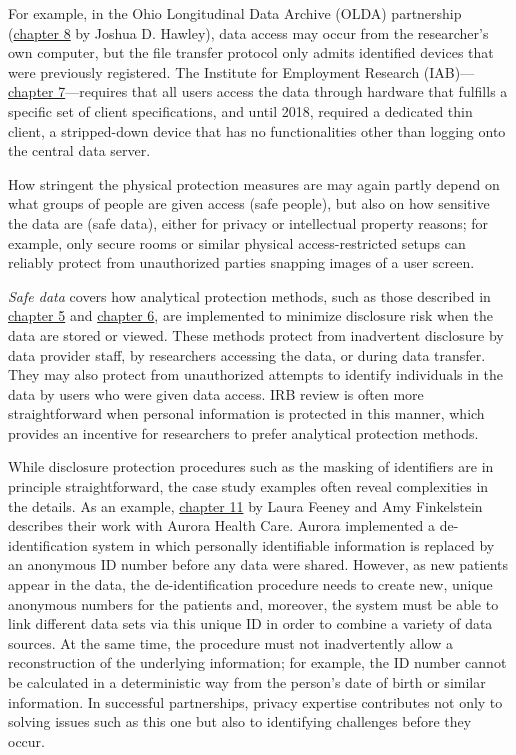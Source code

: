 For example, in the Ohio Longitudinal Data Archive (OLDA) partnership (\protect\hyperlink{olda}{chapter 8} by Joshua D. Hawley), data access may occur from the researcher's own computer, but the file transfer protocol only admits identified devices that were previously registered. The Institute for Employment Research (IAB)---\protect\hyperlink{iab}{chapter 7}---requires that all users access the data through hardware that fulfills a specific set of client specifications, and until 2018, required a dedicated thin client, a stripped-down device that has no functionalities other than logging onto the central data server.

How stringent the physical protection measures are may again partly depend on what groups of people are given access (safe people), but also on how sensitive the data are (safe data), either for privacy or intellectual property reasons; for example, only secure rooms or similar physical access-restricted setups can reliably protect from unauthorized parties snapping images of a user screen.

\emph{Safe data} covers how analytical protection methods, such as those described in \protect\hyperlink{discavoid}{chapter 5} and \protect\hyperlink{diffpriv}{chapter 6}, are implemented to minimize disclosure risk when the data are stored or viewed. These methods protect from inadvertent disclosure by data provider staff, by researchers accessing the data, or during data transfer. They may also protect from unauthorized attempts to identify individuals in the data by users who were given data access. IRB review is often more straightforward when personal information is protected in this manner, which provides an incentive for researchers to prefer analytical protection methods.

While disclosure protection procedures such as the masking of identifiers are in principle straightforward, the case study examples often reveal complexities in the details. As an example, \protect\hyperlink{ahc}{chapter 11} by Laura Feeney and Amy Finkelstein describes their work with Aurora Health Care. Aurora implemented a de-identification system in which personally identifiable information is replaced by an anonymous ID number before any data were shared. However, as new patients appear in the data, the de-identification procedure needs to create new, unique anonymous numbers for the patients and, moreover, the system must be able to link different data sets via this unique ID in order to combine a variety of data sources. At the same time, the procedure must not inadvertently allow a reconstruction of the underlying information; for example, the ID number cannot be calculated in a deterministic way from the person's date of birth or similar information. In successful partnerships, privacy expertise contributes not only to solving issues such as this one but also to identifying challenges before they occur.

